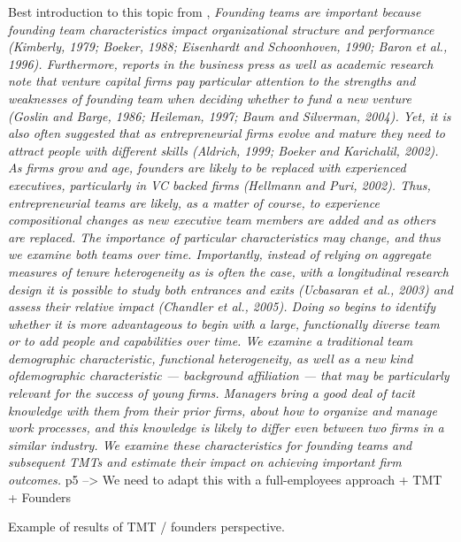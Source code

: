 Best introduction to this topic from \citet{beckman2007early}, \textit{Founding teams are important because founding team characteristics impact organizational structure and performance (Kimberly, 1979; Boeker, 1988; Eisenhardt and Schoonhoven, 1990; Baron et al., 1996). Furthermore, reports in the business press as well as academic research note that venture capital firms pay particular attention to the strengths and weaknesses of founding team when deciding whether to fund a new venture (Goslin and Barge, 1986; Heileman, 1997; Baum and Silverman, 2004). Yet, it is also often suggested that as entrepreneurial firms evolve and mature they need to attract people with different skills (Aldrich, 1999; Boeker and Karichalil, 2002). As firms grow and age, founders are likely to be replaced with experienced executives, particularly in VC backed firms (Hellmann and Puri, 2002). Thus, entrepreneurial teams are likely, as a matter of course, to experience compositional changes as new executive team members are added and as others are replaced. The importance of particular characteristics may change, and thus we examine both teams over time. Importantly, instead of relying on aggregate measures of tenure heterogeneity as is often the case, with a longitudinal research design it is possible to study both entrances and exits (Ucbasaran et al., 2003) and assess their relative impact (Chandler et al., 2005). Doing so begins to identify whether it is more advantageous to begin with a large, functionally diverse team or to add people and capabilities over time. We examine a traditional team demographic characteristic, functional heterogeneity, as well as a new kind ofdemographic characteristic — background affiliation — that may be particularly relevant for the success of young firms. Managers bring a good deal of tacit knowledge with them from their prior firms, about how to organize and manage work processes, and this knowledge is likely to differ even between two firms in a similar industry. We examine these characteristics for founding teams and subsequent TMTs and estimate their impact on achieving important firm outcomes.} p5 --> We need to adapt this with a full-employees approach + TMT + Founders

Example of results of TMT / founders perspective.

